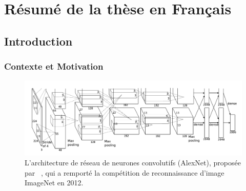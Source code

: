 \chapter{Résumé de la thèse en Français}
\label{appendix:ap7-resume_de_la_thèse_en_français}

\begingroup
{}
\localtoc
\endgroup


\section{Introduction}
\label{section:ap7-introduction}

\subsection{Contexte et Motivation}
\label{subsection:ap7-context_and_motivation}

\begin{figure}[t]
  \centering
  \includegraphics[scale=0.2]{figures/main/ch1-introduction/alexnet.png}
  \caption{L'architecture de réseau de neurones convolutifs (AlexNet), proposée par ~\citet{krizhevsky2012imagenet}, qui a remporté la compétition de reconnaissance d'image ImageNet en 2012.}
  \label{figure:ap7-alexnet_network}
\end{figure}

